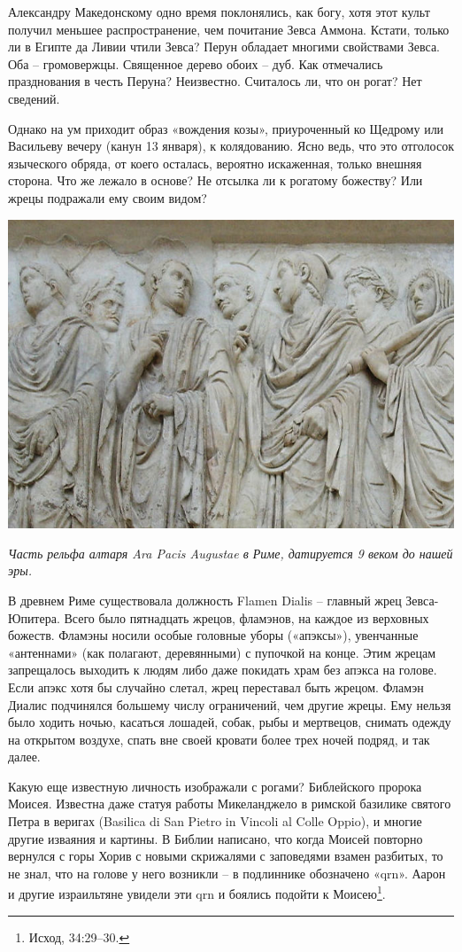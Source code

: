 Александру Македонскому одно время поклонялись, как богу, хотя этот культ получил меньшее распространение, чем почитание Зевса Аммона. Кстати, только ли в Египте да Ливии чтили Зевса? Перун обладает многими свойствами Зевса. Оба – громовержцы. Священное дерево обоих – дуб. Как отмечались празднования в честь Перуна? Неизвестно. Считалось ли, что он рогат? Нет сведений.

Однако на ум приходит образ «вождения козы», приуроченный ко Щедрому или Васильеву вечеру (канун 13 января), к колядованию. Ясно ведь, что это отголосок языческого обряда, от коего осталась, вероятно искаженная, только внешняя сторона. Что же лежало в основе? Не отсылка ли к рогатому божеству? Или жрецы подражали ему своим видом?

\begin{center}
\includegraphics[width=0.70\linewidth]{chast-colebanie-osnov/polane/ara_pacis_fregio_lato_ovest_2_b.jpg}

\textit{Часть рельфа алтаря Ara Pacis Augustae в Риме, датируется 9 веком до нашей эры.}
\end{center} 

В древнем Риме существовала должность Flamen Dialis – главный жрец Зевса-Юпитера. Всего было пятнадцать жрецов, фламэнов, на каждое из верховных божеств. Фламэны носили особые головные уборы («апэксы»), увенчанные «антеннами» (как полагают, деревянными) с пупочкой на конце. Этим жрецам запрещалось выходить к людям либо даже покидать храм без апэкса на голове. Если апэкс хотя бы случайно слетал, жрец переставал быть жрецом. Фламэн Диалис подчинялся большему числу ограничений, чем другие жрецы. Ему нельзя было ходить ночью, касаться лошадей, собак, рыбы и мертвецов, снимать одежду на открытом воздухе, спать вне своей кровати более трех ночей подряд, и так далее. 

Какую еще известную личность изображали с рогами? Библейского пророка Моисея. Известна даже статуя работы Микеланджело в римской базилике святого Петра в веригах (Basilica di San Pietro in Vincoli al Colle Oppio), и многие другие изваяния и картины. В Библии написано, что когда Моисей повторно вернулся с горы Хорив с новыми скрижалями с заповедями взамен разбитых, то не знал, что на голове у него возникли – в подлиннике обозначено «qrn». Аарон и другие израильтяне увидели эти qrn и боялись подойти к Моисею\footnote{Исход, 34:29–30.}.

